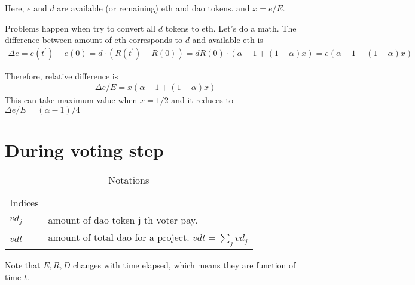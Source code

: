 \documentclass{jarticle}
\begin{document}
Here, $e$ and $d$ are available (or remaining) eth and dao tokens. and $x = e/E$. 

Problems happen when try to convert all $d$ tokens to eth. Let's do a math.
The difference between amount of eth corresponds to $d$ and available eth is 
\begin{align*}
    \Delta e = e(t^\prime) - e(0) = d \cdot ( R(t^\prime)  - R(0) )= dR(0)\cdot (\alpha - 1 + (1-\alpha)x) = e(\alpha - 1 + (1-\alpha)x) 
\end{align*}

Therefore, relative difference is 
\begin{align*}
    \Delta e / E =  x(\alpha - 1 + (1-\alpha)x) 
\end{align*}
This can take maximum value when $x = 1/2$ and it reduces to $\Delta e / E = (\alpha - 1)/4$ 


\section{During voting step}


\begin{table}
  \caption{Notations}
  \begin{tabularx}{\textwidth}{@{}p{}X@{}}
  \toprule
    Indices \\
    $vd_j$ & amount of dao token j th voter pay.\\
    $vdt$ & amount of total dao for a project. $vdt = \sum_j vd_j$ \\
  \bottomrule
  \end{tabularx}
  Note that $E, R, D $ changes with time elapsed, which means they are function of time $t$.
  \end{table}


\end{document}
